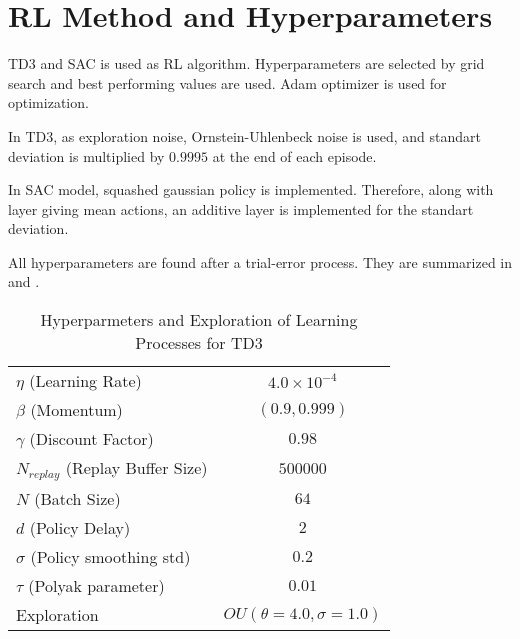 \section{RL Method and Hyperparameters}
\label{sec:rlmethod}

TD3 and SAC is used as RL algorithm. 
Hyperparameters are selected by grid search and best performing values are used. Adam optimizer is used for optimization. 

In TD3, as exploration noise, Ornstein-Uhlenbeck noise is used, and standart deviation is multiplied  by $0.9995$ at the end of each episode. 

In SAC model, squashed gaussian policy is implemented. Therefore, along with layer giving mean actions, an additive layer is implemented for the standart deviation. 

All hyperparameters are found after a trial-error process. They  are summarized in  and .

\begin{table}
	\caption{Hyperparmeters and Exploration of Learning Processes for TD3}
	\begin{tabular}{|l||*{3}{c|}}\hline
		\backslashbox{Hyperparameter}{Model}
		&\makebox[5em]{RFFNN}&\makebox[5em]{LSTM}&\makebox[5em]{Transformer}\\\hline\hline
		$\eta$ (Learning Rate) & \multicolumn{3}{|c|}{$4.0\times10^{-4}$}\\\hline
		$\beta$ (Momentum) & \multicolumn{3}{|c|}{$(0.9, 0.999)$}\\\hline
		$\gamma$ (Discount Factor) & \multicolumn{3}{|c|}{$0.98$} \\\hline
		$N_{replay}$ (Replay Buffer Size) &\multicolumn{3}{|c|}{$500000$} \\\hline
		$N$ (Batch Size) &\multicolumn{3}{|c|}{$64$}\\\hline
		$d$ (Policy Delay) &\multicolumn{3}{|c|}{$2$}\\\hline
		$\sigma$ (Policy smoothing std) &\multicolumn{3}{|c|}{$0.2$}\\\hline
		$\tau$ (Polyak parameter) &\multicolumn{3}{|c|}{$0.01$}\\\hline
		Exploration &\multicolumn{3}{|c|}{$OU(\theta=4.0, \sigma=1.0)$}\\\hline
	\end{tabular}
	\label{table:hyperparams_td3}
\end{table}
\noindent

